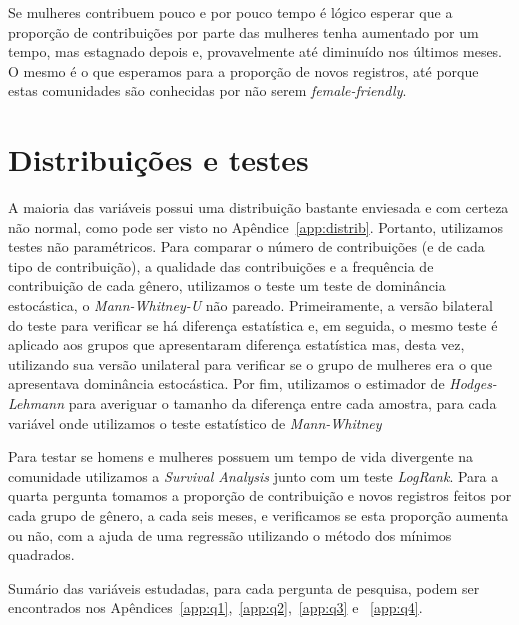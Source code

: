 Se mulheres contribuem pouco e por pouco tempo é lógico esperar que a proporção de contribuições por parte das mulheres tenha aumentado por um tempo, mas estagnado depois e, provavelmente até diminuído nos últimos meses. O mesmo é o que esperamos para a proporção de novos registros, até porque estas comunidades são conhecidas por não serem \emph{female-friendly}.

\section{Distribuições e testes}

A maioria das variáveis possui uma distribuição bastante enviesada e com certeza não normal, como pode ser visto no Apêndice~\ref{app:distrib}. Portanto, utilizamos testes não paramétricos. Para comparar o número de contribuições (e de cada tipo de contribuição), a qualidade das contribuições e a frequência de contribuição de cada gênero, utilizamos o teste um teste de dominância estocástica, o \emph{Mann-Whitney-U} não pareado. Primeiramente, a versão bilateral do teste para verificar se há diferença estatística e, em seguida, o mesmo teste é aplicado aos grupos que apresentaram diferença estatística mas, desta vez, utilizando sua versão unilateral para verificar se o grupo de mulheres era o que apresentava dominância estocástica. Por fim, utilizamos o estimador de \emph{Hodges-Lehmann} para averiguar o tamanho da diferença entre cada amostra, para cada variável onde utilizamos o teste estatístico de \emph{Mann-Whitney}

Para testar se homens e mulheres possuem um tempo de vida divergente na comunidade utilizamos a \textit{Survival Analysis} junto com um teste \emph{LogRank}. Para a quarta pergunta tomamos a proporção de contribuição e novos registros feitos por cada grupo de gênero, a cada seis meses, e verificamos se esta proporção aumenta ou não, com a ajuda de uma regressão utilizando o método dos mínimos quadrados.

Sumário das variáveis estudadas, para cada pergunta de pesquisa, podem ser encontrados nos Apêndices~\ref{app:q1},~\ref{app:q2},~\ref{app:q3} e ~\ref{app:q4}.


